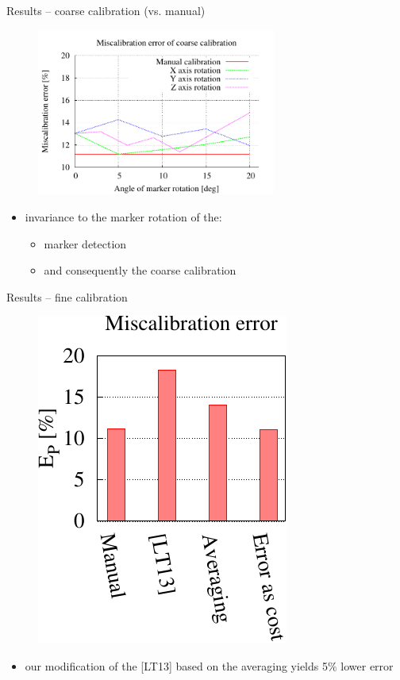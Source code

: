 \documentclass[pdf]{beamer}
\begin{document}
	\begin{frame}{Results -- coarse calibration (vs. manual)}
		\begin{figure}[h]
			\centering
			\includegraphics[width=0.7\textwidth]{fig/results.pdf}
		\end{figure}

		\begin{itemize}
			\item invariance to the marker rotation of the:
			\begin{itemize}
				\item marker detection
				\item and consequently the coarse calibration
			\end{itemize}
		\end{itemize}
	\end{frame}	
	
	\begin{frame}{Results -- fine calibration}
		\begin{figure}[h]
			\includegraphics[height=0.5\textwidth]{fig/evaluation-fine-error.pdf}
		\end{figure}
		
		\begin{itemize}
			\item our modification of the [LT13] based on the averaging yields 5$\%$ lower error
		\end{itemize}
	\end{frame}	
	
\end{document}

